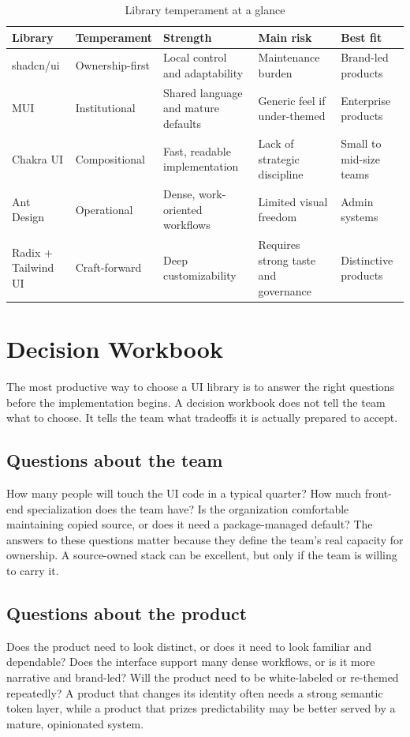 \documentclass[11pt,twoside,a4paper]{article}
\begin{document}
\begin{table}[htbp]
  \centering
  \caption{Library temperament at a glance}
  \begin{tabularx}{\textwidth}{@{}p{}YYYY@{}}
    \toprule
    \textbf{Library} & \textbf{Temperament} & \textbf{Strength} & \textbf{Main risk} & \textbf{Best fit} \\
    \midrule
    shadcn/ui & Ownership-first & Local control and adaptability & Maintenance burden & Brand-led products \\
    MUI & Institutional & Shared language and mature defaults & Generic feel if under-themed & Enterprise products \\
    Chakra UI & Compositional & Fast, readable implementation & Lack of strategic discipline & Small to mid-size teams \\
    Ant Design & Operational & Dense, work-oriented workflows & Limited visual freedom & Admin systems \\
    Radix + Tailwind UI & Craft-forward & Deep customizability & Requires strong taste and governance & Distinctive products \\
    \bottomrule
  \end{tabularx}
\end{table}

\section{Decision Workbook}
The most productive way to choose a UI library is to answer the right questions before the implementation begins. A decision workbook does not tell the team what to choose. It tells the team what tradeoffs it is actually prepared to accept.

\subsection{Questions about the team}
How many people will touch the UI code in a typical quarter? How much front-end specialization does the team have? Is the organization comfortable maintaining copied source, or does it need a package-managed default? The answers to these questions matter because they define the team's real capacity for ownership. A source-owned stack can be excellent, but only if the team is willing to carry it.

\subsection{Questions about the product}
Does the product need to look distinct, or does it need to look familiar and dependable? Does the interface support many dense workflows, or is it more narrative and brand-led? Will the product need to be white-labeled or re-themed repeatedly? A product that changes its identity often needs a strong semantic token layer, while a product that prizes predictability may be better served by a mature, opinionated system.
\end{document}
